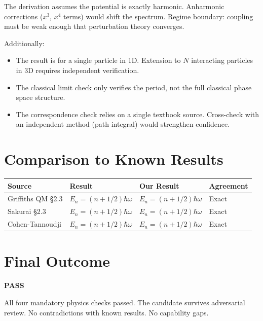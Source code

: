 \documentclass[11pt,a4paper]{article}
\newcommand{\outcomepass}[0]{\textcolor{passgreen}{\textbf{PASS}}}
\begin{document}
\begin{warnbox}
The derivation assumes the potential is exactly harmonic. Anharmonic
corrections ($x^3$, $x^4$ terms) would shift the spectrum. Regime boundary:
coupling must be weak enough that perturbation theory converges.

Additionally:
\begin{itemize}
  \item The result is for a single particle in 1D. Extension to $N$ interacting
    particles in 3D requires independent verification.
  \item The classical limit check only verifies the period, not the full
    classical phase space structure.
  \item The correspondence check relies on a single textbook source. Cross-check
    with an independent method (path integral) would strengthen confidence.
\end{itemize}
\end{warnbox}

\section{Comparison to Known Results}

\begin{longtable}{>{\raggedright}p{3cm} p{3cm} p{3cm} p{3.5cm}}
\toprule
\textbf{Source} & \textbf{Result} & \textbf{Our Result} & \textbf{Agreement} \\
\midrule
\endhead
Griffiths QM \S2.3 & $E_n = (n+1/2)\hbar\omega$ & $E_n = (n+1/2)\hbar\omega$ & Exact \\
Sakurai \S2.3      & $E_n = (n+1/2)\hbar\omega$ & $E_n = (n+1/2)\hbar\omega$ & Exact \\
Cohen-Tannoudji    & $E_n = (n+1/2)\hbar\omega$ & $E_n = (n+1/2)\hbar\omega$ & Exact \\
\bottomrule
\end{longtable}

\section{Final Outcome}

\begin{passbox}[L4 Outcome]
\textbf{\Large \outcomepass}

All four mandatory physics checks passed. The candidate survives adversarial
review. No contradictions with known results. No capability gaps.
\end{passbox}
\end{document}
